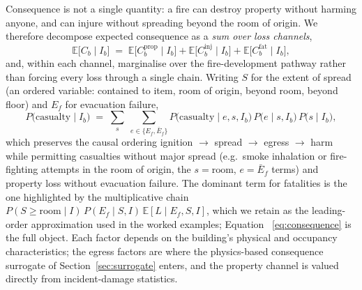 Consequence is not a single quantity: a fire can destroy property without harming
anyone, and can injure without spreading beyond the room of origin. We therefore
decompose expected consequence as a \emph{sum over loss channels},
\begin{equation}
  \mathbb{E}\!\big[C_b \mid I_b\big] \;=\;
  \mathbb{E}\!\big[C^{\mathrm{prop}}_b \mid I_b\big] +
  \mathbb{E}\!\big[C^{\mathrm{inj}}_b \mid I_b\big] +
  \mathbb{E}\!\big[C^{\mathrm{fat}}_b \mid I_b\big],
  \label{eq:consequence-channels}
\end{equation}
and, within each channel, marginalise over the fire-development pathway rather
than forcing every loss through a single chain. Writing $S$ for the extent of
spread (an ordered variable: contained to item, room of origin, beyond room,
beyond floor) and $E_f$ for evacuation failure,
\begin{equation}
  P\!\big(\text{casualty} \mid I_b\big) \;=\;
  \sum_{s}\;\sum_{e \in \{E_f, \bar{E}_f\}}
  P\!\big(\text{casualty} \mid e, s, I_b\big)\,
  P\!\big(e \mid s, I_b\big)\,
  P\!\big(s \mid I_b\big),
  \label{eq:consequence}
\end{equation}
which preserves the causal ordering ignition $\to$ spread $\to$ egress $\to$ harm
while permitting casualties without major spread (e.g.\ smoke inhalation or
fire-fighting attempts in the room of origin, the $s{=}\text{room}$,
$e{=}\bar{E}_f$ terms) and property loss without evacuation failure. The dominant
term for fatalities is the one highlighted by the multiplicative chain
$P(S{\geq}\text{room}\mid I)\,P(E_f\mid S,I)\,\mathbb{E}[L\mid E_f,S,I]$, which we
retain as the leading-order approximation used in the worked examples; Equation~%
\eqref{eq:consequence} is the full object. Each factor depends on the building's
physical and occupancy characteristics; the egress factors are where the
physics-based consequence surrogate of Section~\ref{sec:surrogate} enters,
and the property channel is valued directly from incident-damage statistics.

